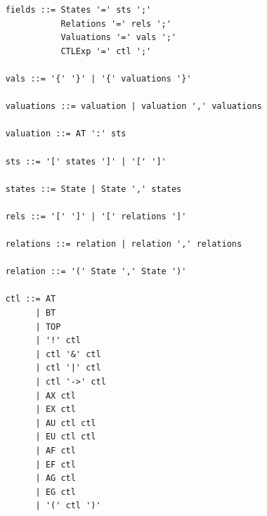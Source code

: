\documentclass[11pt]{article}
\begin{document}
  \begin{verbatim}
    fields ::= States '=' sts ';' 
               Relations '=' rels ';'
               Valuations '=' vals ';'
               CTLExp '=' ctl ';'

    vals ::= '{' '}' | '{' valuations '}'

    valuations ::= valuation | valuation ',' valuations

    valuation ::= AT ':' sts
    
    sts ::= '[' states ']' | '[' ']'

    states ::= State | State ',' states

    rels ::= '[' ']' | '[' relations ']'

    relations ::= relation | relation ',' relations

    relation ::= '(' State ',' State ')'

    ctl ::= AT                        
          | BT                        
          | TOP                       
          | '!' ctl                  
          | ctl '&' ctl               
          | ctl '|' ctl              
          | ctl '->' ctl              
          | AX ctl                     
          | EX ctl                     
          | AU ctl ctl                 
          | EU ctl ctl                 
          | AF ctl                     
          | EF ctl                     
          | AG ctl                     
          | EG ctl                     
          | '(' ctl ')'               

  \end{verbatim}

                
\end{document}
